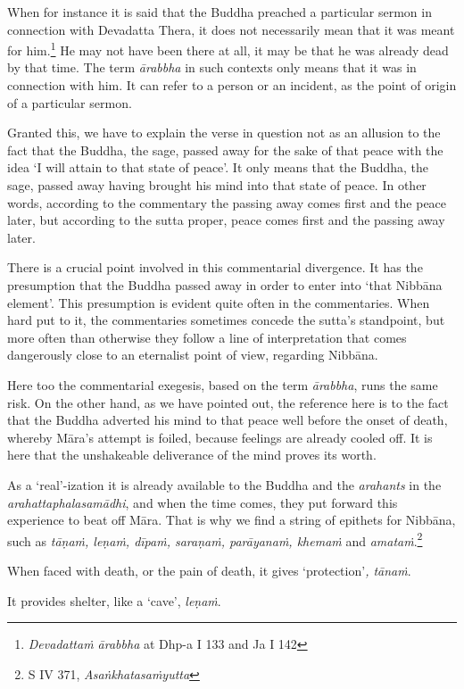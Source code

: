 When for instance it is said that the Buddha preached a particular sermon in connection with Devadatta Thera, it does not necessarily mean that it was meant for him.\footnote{\emph{Devadattaṁ ārabbha} at Dhp-a I 133 and Ja I 142} He may not have been there at all, it may be that he was already dead by that time. The term \emph{ārabbha} in such contexts only means that it was in connection with him. It can refer to a person or an incident, as the point of origin of a particular sermon.

Granted this, we have to explain the verse in question not as an allusion to the fact that the Buddha, the sage, passed away for the sake of that peace with the idea `I will attain to that state of peace'. It only means that the Buddha, the sage, passed away having brought his mind into that state of peace. In other words, according to the commentary the passing away comes first and the peace later, but according to the sutta proper, peace comes first and the passing away later.

There is a crucial point involved in this commentarial divergence. It has the presumption that the Buddha passed away in order to enter into `that Nibbāna element'. This presumption is evident quite often in the commentaries. When hard put to it, the commentaries sometimes concede the sutta's standpoint, but more often than otherwise they follow a line of interpretation that comes dangerously close to an eternalist point of view, regarding Nibbāna.

Here too the commentarial exegesis, based on the term \emph{ārabbha}, runs the same risk. On the other hand, as we have pointed out, the reference here is to the fact that the Buddha adverted his mind to that peace well before the onset of death, whereby Māra's attempt is foiled, because feelings are already cooled off. It is here that the unshakeable deliverance of the mind proves its worth.

As a `real'-ization it is already available to the Buddha and the \emph{arahants} in the \emph{arahattaphalasamādhi}, and when the time comes, they put forward this experience to beat off Māra. That is why we find a string of epithets for Nibbāna, such as \emph{tāṇaṁ, leṇaṁ, dīpaṁ, saraṇaṁ, parāyanaṁ, khemaṁ} and \emph{amataṁ}.\footnote{S IV 371, \emph{Asaṅkhatasaṁyutta}}

When faced with death, or the pain of death, it gives `protection'\emph{, tānaṁ}.

It provides shelter, like a `cave', \emph{leṇaṁ}.

